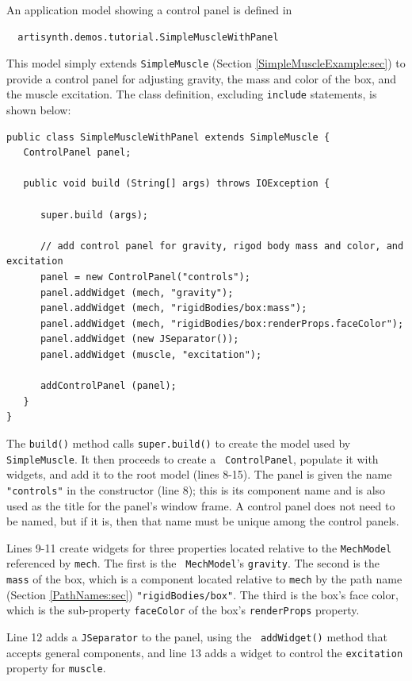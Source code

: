 An application model showing a control panel is defined in
%
\begin{verbatim}
  artisynth.demos.tutorial.SimpleMuscleWithPanel
\end{verbatim}
%
This model simply extends {\tt SimpleMuscle} (Section
\ref{SimpleMuscleExample:sec}) to provide a control panel for
adjusting gravity, the mass and color of the box, and the muscle
excitation. The class definition, excluding {\tt include} statements,
is shown below:
%
\lstset{numbers=left}
\begin{lstlisting}[]
public class SimpleMuscleWithPanel extends SimpleMuscle {
   ControlPanel panel;

   public void build (String[] args) throws IOException {

      super.build (args);

      // add control panel for gravity, rigod body mass and color, and excitation
      panel = new ControlPanel("controls");
      panel.addWidget (mech, "gravity");
      panel.addWidget (mech, "rigidBodies/box:mass");
      panel.addWidget (mech, "rigidBodies/box:renderProps.faceColor");
      panel.addWidget (new JSeparator());
      panel.addWidget (muscle, "excitation");

      addControlPanel (panel);
   }
}
\end{lstlisting}
\lstset{numbers=none}
%
The {\tt build()} method calls {\tt super.build()} to create the model
used by {\tt SimpleMuscle}. It then proceeds to create a {\tt
ControlPanel}, populate it with widgets, and add
it to the root model (lines 8-15). The panel is given the name {\tt
"controls"} in the constructor (line 8); this is its component name
and is also used as the title for the panel's window frame. A control
panel does not need to be named, but if it is, then that name must be
unique among the control panels.

Lines 9-11 create widgets for three properties located relative to the
{\tt MechModel} referenced by {\tt mech}. The first is the {\tt
MechModel}'s {\tt gravity}. The second is the {\tt mass} of the box,
which is a component located relative to {\tt mech} by the path name
(Section \ref{PathNames:sec}) {\tt "rigidBodies/box"}. The third is
the box's face color, which is the sub-property {\tt faceColor} of the
box's {\tt renderProps} property.

Line 12 adds a {\tt JSeparator} to the panel, using the {\tt
addWidget()} method that accepts general components, and line 13 adds
a widget to control the {\tt excitation} property for {\tt muscle}.

